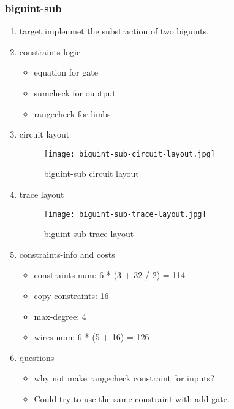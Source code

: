 \subsubsection{biguint-sub}
\label{biguint-sub}

\begin{enumerate}
    \item target
        implenmet the substraction of two biguints.
    \item constraints-logic
        \begin{itemize}
            \item equation for gate
            \item sumcheck for ouptput 
            \item rangecheck for limbs
        \end{itemize}
    \item circuit layout
        \begin{figure}[!ht]
            \centering
            \texttt{[image: biguint-sub-circuit-layout.jpg]}
            \caption{biguint-sub circuit layout}
            \label{fig:biguint-sub-circuit-layout}
        \end{figure}

    \item trace layout
        \begin{figure}[!ht]
            \centering
            \texttt{[image: biguint-sub-trace-layout.jpg]}
            \caption{biguint-sub trace layout}
            \label{fig:biguint-sub-trace-layout}
        \end{figure}
    
    \item constraints-info and costs
        \begin{itemize}
            \item constraints-num: 6 * (3 + 32 / 2) = 114
            \item copy-constraints: 16
            \item max-degree: 4
            \item wires-num: 6 * (5 + 16) = 126
        \end{itemize}

    \item questions
        \begin{itemize}
            \item why not make rangecheck constraint for inputs?
            \item Could try to use the same constraint with add-gate.
        \end{itemize}

\end{enumerate}